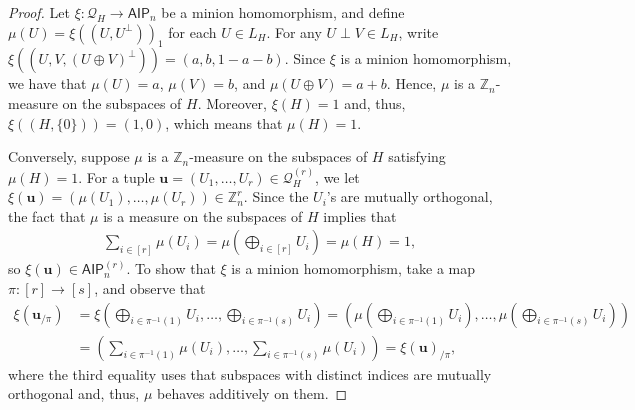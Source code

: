 \documentclass[10pt,a4paper]{amsart}
\newcommand{\AIP}{\mathsf{AIP}}
\newcommand{\Z}{\mathbb Z}
\newcommand{\bu}{\mathbf{u}}
\newcommand{\minion}[1]{{\mathcal #1}}
\begin{document}
\begin{proof}
Let $\xi:\minion Q_H\to\AIP_n$ be a minion homomorphism, and define $\mu(U)=\xi((U,U^\perp))_1$ for each $U\in L_H$. For any $U\perp V\in L_H$, write $\xi((U,V,(U\oplus V)^\perp))=(a,b,1-a-b)$. Since $\xi$ is a minion homomorphism, we have that $\mu(U)=a$, $\mu(V)=b$, and $\mu(U\oplus V)=a+b$. Hence, $\mu$ is a $\Z_n$-measure on the subspaces of $H$. Moreover, $\xi(H)=1$ and, thus, $\xi((H,\{0\}))=(1,0)$, which means that $\mu(H)=1$.

Conversely, suppose $\mu$ is a $\Z_n$-measure  on the subspaces of $H$ satisfying $\mu(H)=1$. For a tuple $\bu=(U_1,\dots,U_r)\in\minion Q_H^{(r)}$, we let $\xi(\bu)=(\mu(U_1),\dots,\mu(U_r))\in\Z_n^r$. Since the $U_i$'s are mutually orthogonal, the fact that $\mu$ is a measure on the subspaces of $H$ implies that 
    \begin{align*}\sum_{i\in[r]}\mu(U_i)=\mu\left(\bigoplus_{i\in[r]}U_i\right)=\mu(H)=1,
    \end{align*}
    so $\xi(\bu)\in\AIP_n^{(r)}$. To show that $\xi$ is a minion homomorphism, take a map $\pi:[r]\to[s]$, and observe that
    \begin{align*}
        \xi(\bu_{/\pi})
        &=
        \xi\left(\bigoplus_{i\in\pi^{-1}(1)}U_i,\dots,\bigoplus_{i\in\pi^{-1}(s)}U_i\right)
        =
        \left(\mu\left(\bigoplus_{i\in\pi^{-1}(1)}U_i\right),\dots,\mu\left(\bigoplus_{i\in\pi^{-1}(s)}U_i\right)\right)\\
        &=\left(\sum_{i\in\pi^{-1}(1)}\mu(U_i),\dots,\sum_{i\in\pi^{-1}(s)}\mu(U_i)\right)
        =
        \xi(\bu)_{/\pi},
    \end{align*}
    where the third equality uses that subspaces with distinct indices are mutually orthogonal and, thus, $\mu$ behaves additively on them. 
\end{proof}
\end{document}
